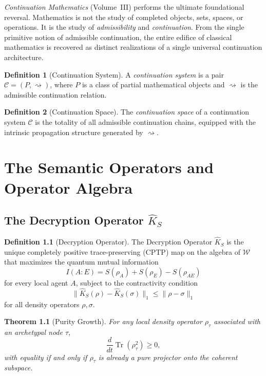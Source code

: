 \documentclass[12pt,anyside]{book}
\theoremstyle{plain}
\newtheorem{theorem}{Theorem}[chapter]
\theoremstyle{definition}
\newtheorem{definition}{Definition}[chapter]
\newcommand{\W}{\mathcal{W}}          %
\newcommand{\Khat}{\hat{K}_S}          %
\newcommand{\Ccal}{\mathcal{C}}        %
\begin{document}
\emph{Continuation Mathematics} (Volume~III) performs the ultimate foundational reversal. Mathematics is not the study of completed objects, sets, spaces, or operations. It is the study of \emph{admissibility} and \emph{continuation}. From the single primitive notion of admissible continuation, the entire edifice of classical mathematics is recovered as distinct realizations of a single universal continuation architecture.

\begin{definition}[Continuation System]\label{def:contsys}
A \emph{continuation system} is a pair $\Ccal = (P, \rightsquigarrow)$, where $P$ is a class of partial mathematical objects and $\rightsquigarrow$ is the admissible continuation relation.
\end{definition}

\begin{definition}[Continuation Space]\label{def:contspace}
The \emph{continuation space} of a continuation system $\Ccal$ is the totality of all admissible continuation chains, equipped with the intrinsic propagation structure generated by $\rightsquigarrow$.
\end{definition}

\chapter{The Semantic Operators and Operator Algebra}

\section{The Decryption Operator $\Khat$}

\begin{definition}[Decryption Operator]\label{def:decrypt}
The Decryption Operator $\Khat$ is the unique completely positive trace-preserving (CPTP) map on the algebra of $\W$ that maximizes the quantum mutual information
\[
I(A:E) = S(\rho_A) + S(\rho_E) - S(\rho_{AE})
\]
for every local agent $A$, subject to the contractivity condition
\[
\|\Khat(\rho) - \Khat(\sigma)\|_1 \leq \|\rho - \sigma\|_1
\]
for all density operators $\rho, \sigma$.
\end{definition}

\begin{theorem}[Purity Growth]\label{thm:purity}
For any local density operator $\rho_\tau$ associated with an archetypal node $\tau$,
\[
\frac{d}{dt}\operatorname{Tr}(\rho_\tau^2) \geq 0,
\]
with equality if and only if $\rho_\tau$ is already a pure projector onto the coherent subspace.
\end{theorem}
\end{document}
